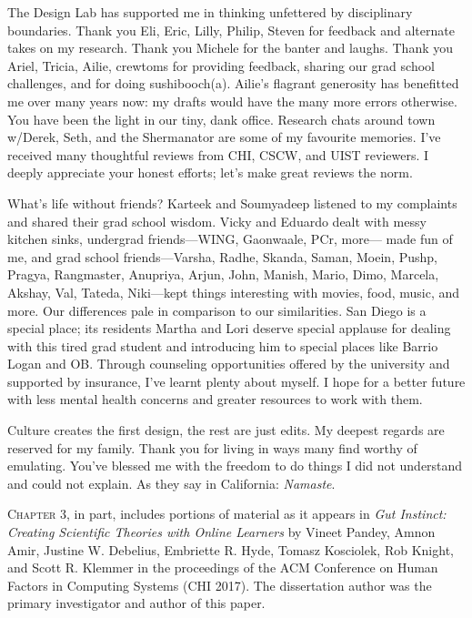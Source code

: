 \begin{frontmatter}
\begin{acknowledgements}
The Design Lab has supported me in thinking unfettered by disciplinary boundaries. Thank you Eli, Eric, Lilly, Philip, Steven for feedback and alternate takes on my research. Thank you Michele for the banter and laughs. Thank you Ariel, Tricia, Ailie, crewtoms for providing feedback, sharing our grad school challenges, and for doing sushibooch(a). Ailie's flagrant generosity has benefitted me over many years now: my drafts would have the many more errors otherwise. You have been the light in our tiny, dank office. Research chats around town w/Derek, Seth, and the Shermanator are some of my favourite memories. I’ve received many thoughtful reviews from CHI, CSCW, and UIST reviewers. I deeply appreciate your honest efforts; let’s make great reviews the norm.

What’s life without friends? Karteek and Soumyadeep listened to my complaints and shared their grad school wisdom. Vicky and Eduardo dealt with messy kitchen sinks, undergrad friends---WING, Gaonwaale, PCr, more--- made fun of me, and grad school friends---Varsha, Radhe, Skanda, Saman, Moein, Pushp, Pragya, Rangmaster, Anupriya, Arjun, John, Manish, Mario, Dimo, Marcela, Akshay, Val, Tateda, Niki---kept things interesting with movies, food, music, and more. Our differences pale in comparison to our similarities. San Diego is a special place; its residents Martha and Lori deserve special applause for dealing with this tired grad student and introducing him to special places like Barrio Logan and OB. Through counseling opportunities offered by the university and supported by insurance, I’ve learnt plenty about myself. I hope for a better future with less mental health concerns and greater resources to work with them.

Culture creates the first design, the rest are just edits. My deepest regards are reserved for my family. Thank you for living in ways many find worthy of emulating. You've blessed me with the freedom to do things I did not understand and could not explain. As they say in California: \textit{Namaste}. 



\vspace{0.25in}

\textsc{Chapter 3}, in part, includes portions of material as it appears in \emph{Gut Instinct: Creating Scientific Theories with Online Learners} by Vineet Pandey, Amnon Amir, Justine W. Debelius, Embriette R. Hyde, Tomasz Kosciolek, Rob Knight, and Scott R. Klemmer in the proceedings of the ACM Conference on Human Factors in Computing Systems (CHI 2017). The dissertation author was the primary investigator and author of this paper.


\end{acknowledgements}
\end{frontmatter}
